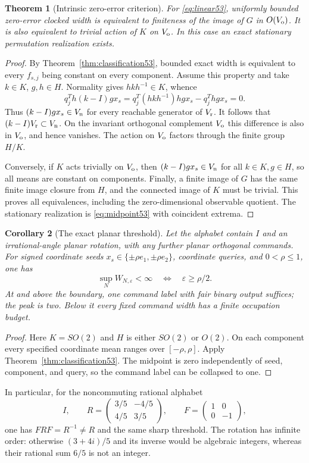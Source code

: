 \documentclass[11pt]{amsart}
\numberwithin{equation}{section}
\newtheorem{theorem}{Theorem}[section]
\newtheorem{corollary}[theorem]{Corollary}
\theoremstyle{definition}
\theoremstyle{remark}
\begin{document}
\begin{theorem}[Intrinsic zero-error criterion]\label{thm:observable53}
For \eqref{eq:linear53}, uniformly bounded zero-error clocked width is equivalent to finiteness of the image of $G$ in $O(V_{\rm o})$. It is also equivalent to trivial action of $K$ on $V_{\rm o}$. In this case an exact stationary permutation realization exists.
\end{theorem}
\begin{proof}
By Theorem~\ref{thm:classification53}, bounded exact width is equivalent to every $f_{s,j}$ being constant on every component. Assume this property and take $k\in K$, $g,h\in H$. Normality gives $hkh^{-1}\in K$, whence
\[
 q_j^Th(k-I)gx_s
 =q_j^T(hkh^{-1})hgx_s-q_j^Thgx_s=0.
\]
Thus $(k-I)gx_s\in V_{\rm n}$ for every reachable generator of $V_{\rm r}$. It follows that $(k-I)V_{\rm r}\subset V_{\rm n}$. On the invariant orthogonal complement $V_{\rm o}$ this difference is also in $V_{\rm o}$, and hence vanishes. The action on $V_{\rm o}$ factors through the finite group $H/K$.

Conversely, if $K$ acts trivially on $V_{\rm o}$, then $(k-I)gx_s\in V_{\rm n}$ for all $k\in K,g\in H$, so all means are constant on components. Finally, a finite image of $G$ has the same finite image closure from $H$, and the connected image of $K$ must be trivial. This proves all equivalences, including the zero-dimensional observable quotient. The stationary realization is \eqref{eq:midpoint53} with coincident extrema.
\end{proof}

\begin{corollary}[The exact planar threshold]\label{cor:circle53}
Let the alphabet contain $I$ and an irrational-angle planar rotation, with any further planar orthogonal commands. For signed coordinate seeds $x_s\in\{\pm\rho e_1,\pm\rho e_2\}$, coordinate queries, and $0<\rho\le1$, one has
\[
 \sup_N W_{N,\varepsilon}<\infty\quad\Longleftrightarrow\quad
 \varepsilon\ge\rho/2.
\]
At and above the boundary, one command label with fair binary output suffices; the peak is two. Below it every fixed command width has a finite occupation budget.
\end{corollary}
\begin{proof}
Here $K=SO(2)$ and $H$ is either $SO(2)$ or $O(2)$. On each component every specified coordinate mean ranges over $[-\rho,\rho]$. Apply Theorem~\ref{thm:classification53}. The midpoint is zero independently of seed, component, and query, so the command label can be collapsed to one.
\end{proof}
In particular, for the noncommuting rational alphabet
\[
 I,\qquad R=\begin{pmatrix}3/5&-4/5\\4/5&3/5\end{pmatrix},\qquad
 F=\begin{pmatrix}1&0\\0&-1\end{pmatrix},
\]
one has $FRF=R^{-1}\ne R$ and the same sharp threshold. The rotation has infinite order: otherwise $(3+4i)/5$ and its inverse would be algebraic integers, whereas their rational sum $6/5$ is not an integer.
\end{document}
